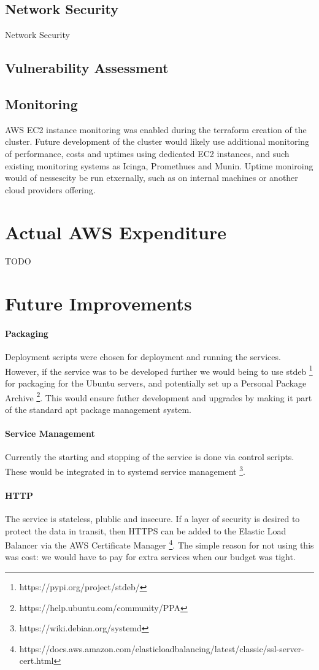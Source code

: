 \documentclass[conference]{IEEEtran}
\begin{document}
\subsection{Network Security}
Network Security
\subsection{Vulnerability Assessment}
\subsection{Monitoring}
AWS EC2 instance monitoring was enabled during the terraform creation of the cluster. Future development of the cluster would likely use additional monitoring of performance, costs and uptimes using dedicated EC2 instances, and such existing monitoring systems as Icinga, Promethues and Munin. Uptime moniroing would of nessescity be run etxernally, such as on internal machines or another cloud providers offering.
\section{Actual AWS Expenditure}
TODO
\section{Future Improvements}
\paragraph{Packaging}
Deployment scripts were chosen for deployment and running the services. However, if the service was to be developed further we would being to use stdeb \footnote{https://pypi.org/project/stdeb/} for packaging for the Ubuntu servers, and potentially set up a Personal Package Archive \footnote{https://help.ubuntu.com/community/PPA}. This would ensure futher development and upgrades by making it part of the standard apt package management system.
\paragraph{Service Management}
Currently the starting and stopping of the service is done via control scripts. These would be integrated in to systemd service management \footnote{https://wiki.debian.org/systemd}.
\paragraph{HTTP}
The service is stateless, plublic and insecure. If a layer of security is desired to protect the data in transit, then HTTPS can be added to the Elastic Load Balancer via the AWS Certificate Manager \footnote{https://docs.aws.amazon.com/elasticloadbalancing/latest/classic/ssl-server-cert.html}. The simple reason for not using this was cost: we would have to pay for extra services when our budget was tight.
\end{document}
